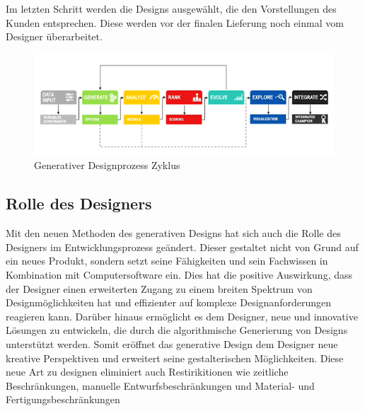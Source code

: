 Im letzten Schritt werden die Designs ausgewählt, die den Vorstellungen des Kunden entsprechen. Diese werden vor der finalen Lieferung noch einmal vom Designer überarbeitet. \autocite{12} \autocite{15} \autocite*{16}


\begin{figure}[h]
  \centering
  \begin{minipage}{0.5\textwidth}
    \centering
    \includegraphics[width=\textwidth]{./images/7stepDesignProzess.png}
  \end{minipage}
  \caption{Generativer Designprozess Zyklus}
  \label{fig:designprozess}
\end{figure}

\subsection*{Rolle des Designers}

Mit den neuen Methoden des generativen Designs hat sich auch die Rolle des Designers im Entwicklungsprozess geändert. Dieser gestaltet nicht von Grund auf ein neues Produkt, sondern setzt seine Fähigkeiten und sein Fachwissen in Kombination mit Computersoftware ein. Dies hat die positive Auswirkung, dass der Designer einen erweiterten Zugang zu einem breiten Spektrum von Designmöglichkeiten hat und effizienter auf komplexe Designanforderungen reagieren kann. Darüber hinaus ermöglicht es dem Designer, neue und innovative Lösungen zu entwickeln, die durch die algorithmische Generierung von Designs unterstützt werden. Somit eröffnet das generative Design dem Designer neue kreative Perspektiven und erweitert seine gestalterischen Möglichkeiten. Diese neue Art zu designen eliminiert auch Restirikitionen wie zeitliche Beschränkungen, manuelle Entwurfsbeschränkungen und Material- und Fertigungsbeschränkungen \autocite*{16}